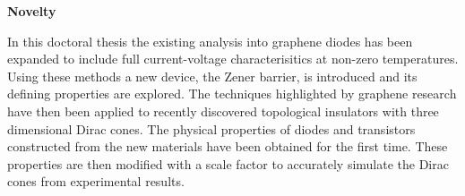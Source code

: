 %
\thispagestyle{plain}
\begin{center}
	\Large
	\textbf{Novelty}
\end{center}
	In this doctoral thesis the existing analysis into graphene diodes has been expanded to include full current-voltage characterisitics at non-zero temperatures. Using these methods a new device, the Zener barrier, is introduced and its defining properties are explored. The techniques highlighted by graphene research have then been applied to recently discovered topological insulators with three dimensional Dirac cones. The physical properties of diodes and transistors constructed from the new materials have been obtained for the first time. These properties are then modified with a scale factor to accurately simulate the Dirac cones from experimental results.
%
